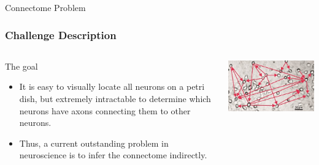 \documentclass{beamer}
\begin{document}
\begin{frame}{Connectome Problem}

\frametitle{Challenge Description}
  \begin{columns}[T]
    \begin{column}{.5\textwidth}
     \begin{block}{The goal}
\begin{itemize}

\item It is easy to visually locate all neurons on a petri dish, but extremely intractable to determine which neurons have axons connecting them to other neurons.
\item Thus, a current outstanding problem in neuroscience is to infer the connectome indirectly. 
\end{itemize}

    \end{block}
    \end{column}
    \begin{column}{.5\textwidth}
    \begin{block}{}
    \includegraphics[width=\textwidth]{connectivity.jpg}
    \end{block}
    \end{column}
  \end{columns}
\end{frame}
\end{document}
